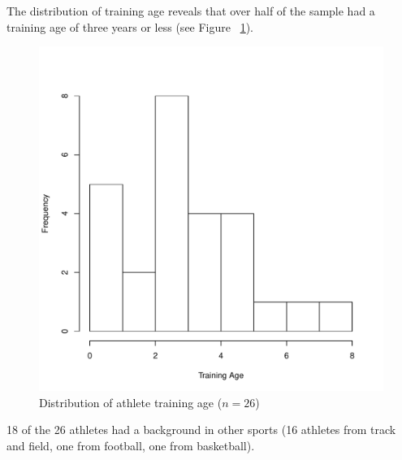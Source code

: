 \begin{CJK}{UTF8}{gbsn}
The distribution of training age reveals that over half of the sample had a training age of three years or less (see Figure ~\ref{fig:ethnoTrainingAgeHist}).
                          \begin{figure}[htbp]
                           \begin{center}
                           \includegraphics[scale=.3]{images/ethnoTrainingAgeHist.pdf}
                             \caption{Distribution of athlete training age ($n = 26$)}
                           \end{center}
                             \label{fig:ethnoTrainingAgeHist}
                          \end{figure}
18 of the 26 athletes had a background in other sports (16 athletes from track and field, one from football, one from basketball).

\end{CJK}
